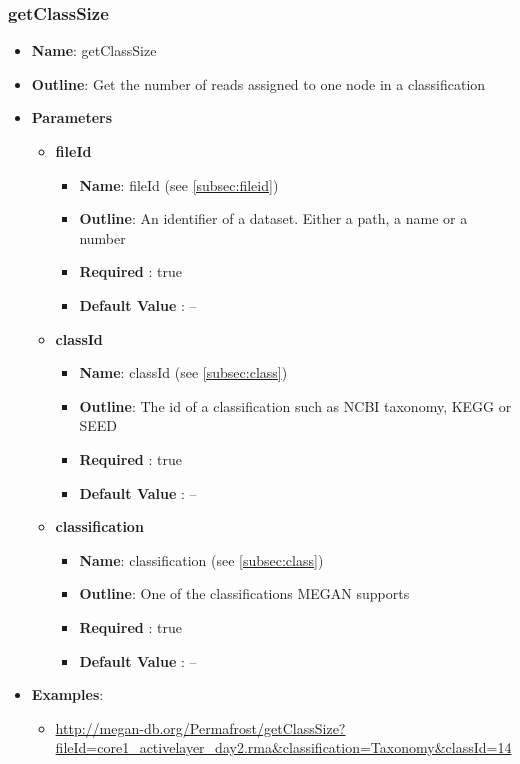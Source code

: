 \documentclass[11pt]{article}
\begin{document}
\subsubsection{getClassSize}
\begin{itemize}
	\item \textbf{Name}: getClassSize
	\item \textbf{Outline}: Get the number of reads assigned to one node in a classification
	\item \textbf{Parameters}
		\begin{itemize}
			\item \textbf{fileId}		
				\begin{itemize}
					\item \textbf{Name}: fileId (see \ref{subsec:fileid})
					\item \textbf{Outline}: An identifier of a dataset. Either a path, a name or a number
					\item \textbf{Required} : true
					\item \textbf{Default Value} : --
				\end{itemize}
			\item \textbf{classId}		
				\begin{itemize}
					\item \textbf{Name}: classId (see \ref{subsec:class})
					\item \textbf{Outline}: The id of a classification such as NCBI taxonomy, KEGG or SEED
					\item \textbf{Required} : true
					\item \textbf{Default Value} : --
				\end{itemize}
			\item \textbf{classification}		
				\begin{itemize}
					\item \textbf{Name}: classification (see \ref{subsec:class})
					\item \textbf{Outline}: One of the classifications MEGAN supports
					\item \textbf{Required} : true
					\item \textbf{Default Value} : --
				\end{itemize}
		\end{itemize}
	\item \textbf{Examples}:
		\begin{itemize}		
			\item \url{http://megan-db.org/Permafrost/getClassSize?fileId=core1_activelayer_day2.rma&classification=Taxonomy&classId=14}
		\end{itemize}
\end{itemize}
\end{document}
